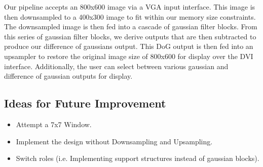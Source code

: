 Our pipeline accepts an 800x600 image via a VGA input interface. This image 
is then downsampled to a 400x300 image to fit within our memory size constraints. 
The downsampled image is then fed into a cascade of gaussian filter blocks. From this
series of gaussian filter blocks, we derive outputs that are then subtracted to 
produce our difference of gaussians output. This DoG output is then fed into 
an upsampler to restore the original image size of 800x600 for display over
the DVI interface. Additionally, the user can select between various gaussian and 
difference of gaussian outputs for display.

\subsection{Ideas for Future Improvement}

\begin{itemize}\itemsep0em
    \item Attempt a 7x7 Window.
    \item Implement the design without Downsampling and Upsampling.
    \item Switch roles (i.e. Implementing support structures instead of gaussian blocks).
\end{itemize}


